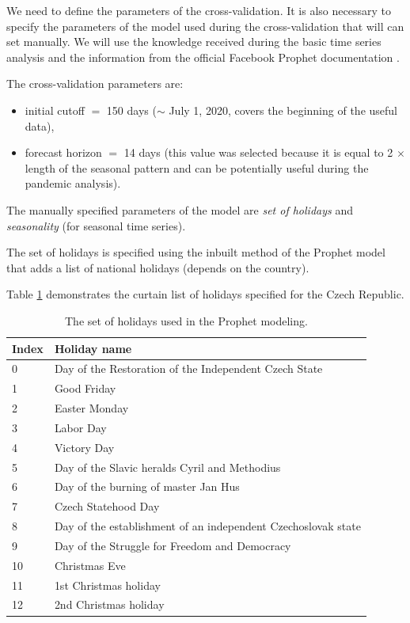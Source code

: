 We need to define the parameters of the cross-validation. It is also necessary to specify the parameters of the model used during the cross-validation that will can set manually. We will use the knowledge received during the basic time series analysis and the information from the official Facebook Prophet documentation \cite{ProphetDoc}.

The cross-validation parameters are: 
\begin{itemize}
    \item initial cutoff $=$ 150 days ($\sim$ July 1, 2020, covers the beginning of the useful data),
    \item forecast horizon $=$ 14 days (this value was selected because it is equal to 2 $\times$ length of the seasonal pattern and can be potentially useful during the pandemic analysis).
\end{itemize}

The manually specified parameters of the model are \textit{set of holidays} and \textit{seasonality} (for seasonal time series).

The set of holidays is specified using the inbuilt method of the Prophet model that adds a list of national holidays (depends on the country).

Table \ref{tab:holidays_set} demonstrates the curtain list of holidays specified for the Czech Republic.

\begin{table}[!ht]
    \centering
    \begin{tabular}{|p{1cm}||p{8cm}|}
    \hline
    Index & Holiday name\\
    \hline
    0 & Day of the Restoration of the Independent Czech State \\
    \hline
    1 & Good Friday\\
    \hline
    2 & Easter Monday\\
    \hline
    3 & Labor Day\\
    \hline
    4 & Victory Day\\
    \hline
    5 & Day of the Slavic heralds Cyril and Methodius\\
    \hline
    6 & Day of the burning of master Jan Hus\\
    \hline
    7 & Czech Statehood Day\\
    \hline
    8 & Day of the establishment of an independent Czechoslovak state\\
    \hline
    9 & Day of the Struggle for Freedom and Democracy\\
    \hline
    10 & Christmas Eve\\
    \hline
    11 & 1st Christmas holiday\\
    \hline
    12 & 2nd Christmas holiday\\
    \hline
\end{tabular}
    \caption{The set of holidays used in the Prophet modeling.}
    \label{tab:holidays_set}
\end{table}

